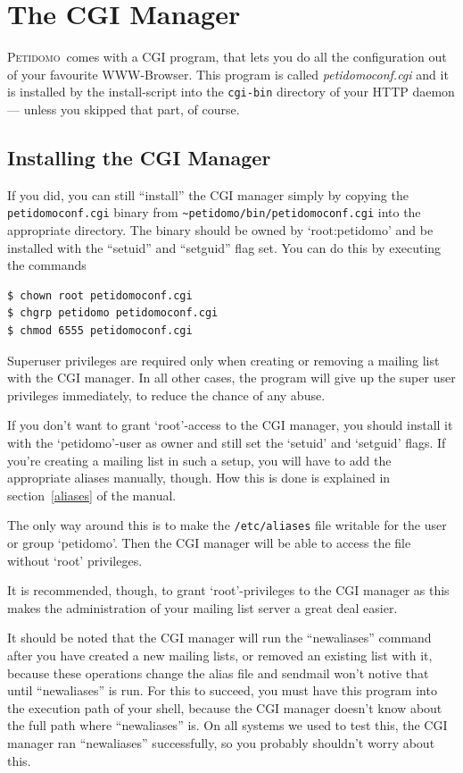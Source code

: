 \documentclass[a4paper]{report}
\newcommand{\Petidomo}{{\scshape Peti\-domo}}
\newcommand{\Def}[1]{{\index{#1}\sl #1}}
\newcommand{\file}[1]{{\tt #1}}
\begin{document}
\section{The CGI Manager}

\Petidomo\ comes with a CGI program, that lets you do all the
configuration out of your favourite WWW-Browser. This program is
called \Def{petidomoconf.cgi} and it is installed by the
install-script into the \file{cgi-bin} directory of your HTTP daemon
--- unless you skipped that part, of course.

\subsection{Installing the CGI Manager}

If you did, you can still ``install'' the CGI manager simply by
copying the \file{petidomoconf.cgi} binary from
\file{\~{}petidomo/bin/petidomoconf.cgi} into the appropriate directory.
The binary should be owned by `root:petidomo' and be installed with
the ``setuid'' and ``setguid'' flag set. You can do this by executing
the commands
\begin{verbatim}
$ chown root petidomoconf.cgi
$ chgrp petidomo petidomoconf.cgi
$ chmod 6555 petidomoconf.cgi
\end{verbatim}

Superuser privileges are required only when creating or removing a
mailing list with the CGI manager. In all other cases, the program
will give up the super user privileges immediately, to reduce the
chance of any abuse.

If you don't want to grant `root'-access to the CGI manager, you
should install it with the `petidomo'-user as owner and still set the
`setuid' and `setguid' flags. If you're creating a mailing list in
such a setup, you will have to add the appropriate aliases manually,
though. How this is done is explained in section~\ref{aliases} of the
manual.

The only way around this is to make the \file{/etc/aliases} file
writable for the user or group `petidomo'. Then the CGI manager will
be able to access the file without `root' privileges.

It is recommended, though, to grant `root'-privileges to the CGI
manager as this makes the administration of your mailing list server a
great deal easier.

It should be noted that the CGI manager will run the ``newaliases''
command after you have created a new mailing lists, or removed an
existing list with it, because these operations change the alias file
and sendmail won't notive that until ``newaliases'' is run. For this
to succeed, you must have this program into the execution path of your
shell, because the CGI manager doesn't know about the full path where
``newaliases'' is. On all systems we used to test this, the CGI
manager ran ``newaliases'' successfully, so you probably shouldn't
worry about this.
\end{document}
